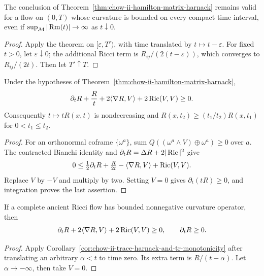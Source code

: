 \begin{remark}
\label{rem:chow-ii-harnack-open-initial-time}


The conclusion of Theorem~\ref{thm:chow-ii-hamilton-matrix-harnack} remains
valid for a flow on \((0,T)\) whose curvature is bounded on every compact time
interval, even if \(\sup_{\mathcal M}|\operatorname{Rm}(t)|\to\infty\) as \(t\downarrow0\).
\end{remark}
\begin{proof}
\sketch Apply the theorem on \([\varepsilon,T')\), with time translated by
\(t\mapsto t-\varepsilon\).  For fixed \(t>0\), let
\(\varepsilon\downarrow0\); the additional Ricci term is
\(R_{ij}/(2(t-\varepsilon))\), which converges to \(R_{ij}/(2t)\).
Then let \(T'\uparrow T\).
\end{proof}

\begin{corollary}
\label{cor:chow-ii-trace-harnack-and-tr-monotonicity}


Under the hypotheses of Theorem~\ref{thm:chow-ii-hamilton-matrix-harnack},
\[
\partial_tR+\frac Rt+2\langle\nabla R,V\rangle+2\operatorname{Ric}(V,V)\ge0.
\]
Consequently \(t\mapsto tR(x,t)\) is nondecreasing and
\(R(x,t_2)\ge(t_1/t_2)R(x,t_1)\) for \(0<t_1\le t_2\).
\end{corollary}
\begin{proof}
\sketch For an orthonormal coframe \(\{\omega^a\}\), sum
\(Q((\omega^a\wedge V)\oplus\omega^a)\ge0\) over \(a\).  The contracted
Bianchi identity and \(\partial_tR=\Delta R+2|\operatorname{Ric}|^2\) give
\[
0\le\tfrac12\partial_tR+\tfrac{R}{2t}-\langle\nabla R,V\rangle+\operatorname{Ric}(V,V).
\]
Replace \(V\) by \(-V\) and multiply by two.  Setting \(V=0\) gives
\(\partial_t(tR)\ge0\), and integration proves the last assertion.
\end{proof}

\begin{corollary}
\label{cor:chow-ii-ancient-trace-harnack}


If a complete ancient Ricci flow has bounded nonnegative curvature operator,
then
\[
\partial_tR+2\langle\nabla R,V\rangle+2\operatorname{Ric}(V,V)\ge0,
\qquad \partial_tR\ge0.
\]
\end{corollary}
\begin{proof}
\sketch Apply Corollary~\ref{cor:chow-ii-trace-harnack-and-tr-monotonicity} after
translating an arbitrary \(\alpha<t\) to time zero.  Its extra term is
\(R/(t-\alpha)\).  Let \(\alpha\to-\infty\), then take \(V=0\).
\end{proof}

